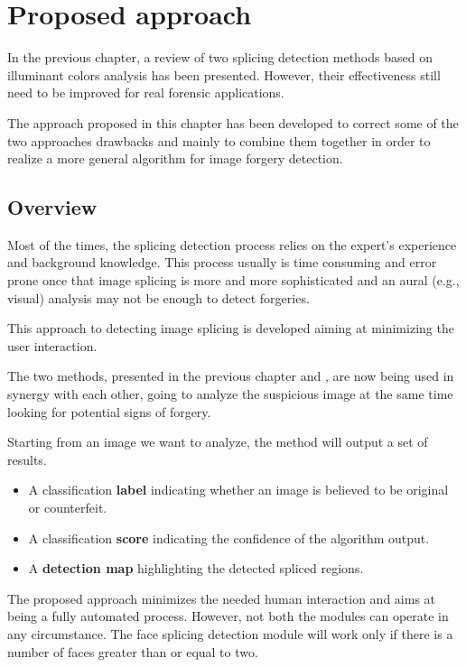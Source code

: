 \chapter{Proposed approach}

In the previous chapter, a review of two splicing detection methods based on illuminant colors analysis has been presented. However, their effectiveness still need to be improved for real forensic applications.

The approach proposed in this chapter has been developed to correct some of the two approaches drawbacks and mainly to combine them together in order to realize a more general algorithm for image forgery detection. 

\section{Overview}

Most of the times, the splicing detection process relies on the expert's experience and background knowledge. This process usually is time consuming and error prone once that image splicing is more and more sophisticated and an aural (e.g., visual) analysis may not be enough to detect forgeries.

This approach to detecting image splicing is developed aiming at minimizing the user interaction. 

The two methods, presented in the previous chapter \cite{carvalho2016illuminant} and \cite{fan2015image}, are now being used in synergy with each other, going to analyze the suspicious image at the same time looking for potential signs of forgery.

Starting from an image we want to analyze, the method will output a set of results.
\begin{itemize}
\item A classification \textbf{label} indicating whether an image is believed to be original or counterfeit.
\item A classification \textbf{score} indicating the confidence of the algorithm output.
\item A \textbf{detection map} highlighting the detected spliced regions.
\end{itemize}

The proposed approach minimizes the needed human interaction and aims at being a fully automated process. However, not both the modules can operate in any circumstance. The face splicing detection module will work only if there is a number of faces greater than or equal to two.

